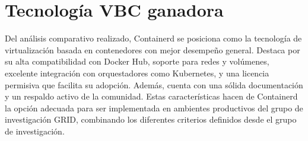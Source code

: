 \section{Tecnología VBC ganadora}

Del análisis comparativo realizado, Containerd se posiciona como la tecnología de virtualización basada en contenedores con mejor desempeño general. Destaca por su alta compatibilidad con Docker Hub, soporte para redes y volúmenes, excelente integración con orquestadores como Kubernetes, y una licencia permisiva que facilita su adopción. Además, cuenta con una sólida documentación y un respaldo activo de la comunidad. Estas características hacen de Containerd la opción adecuada para ser implementada en ambientes productivos del grupo de investigación GRID, combinando los diferentes criterios definidos desde el grupo de investigación.